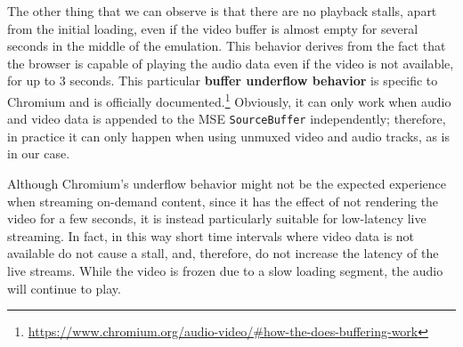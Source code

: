 The other thing that we can observe is that there are no playback stalls, apart from the initial loading, even if the video buffer is almost empty for several seconds in the middle of the emulation. This behavior derives from the fact that the browser is capable of playing the audio data even if the video is not available, for up to 3 seconds. This particular \textbf{buffer underflow behavior} is specific to Chromium and is officially documented.\footnote{\url{https://www.chromium.org/audio-video/#how-the-does-buffering-work}} Obviously, it can only work when audio and video data is appended to the MSE \texttt{SourceBuffer} independently; therefore, in practice it can only happen when using unmuxed video and audio tracks, as is in our case.

Although Chromium's underflow behavior might not be the expected experience when streaming on-demand content, since it has the effect of not rendering the video for a few seconds, it is instead particularly suitable for low-latency live streaming. In fact, in this way short time intervals where video data is not available do not cause a stall, and, therefore, do not increase the latency of the live streams. While the video is frozen due to a slow loading segment, the audio will continue to play.

